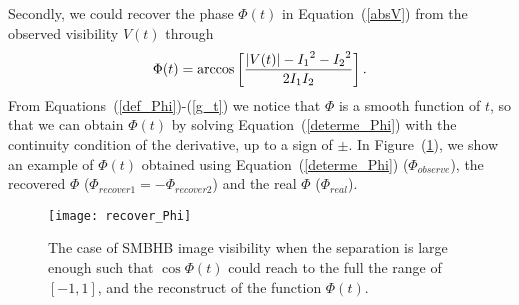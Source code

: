 \documentclass[twocolumn]{aastex62}
\def\[{\left[}
\def\]{\right]}
\def\m{\begin{eqnarray}}
\def\n{\end{eqnarray}}
\begin{document}
Secondly, we could recover the phase $\Phi(t)$ in Equation~(\ref{absV}) from the observed visibility $V(t)$ through
\m \label{determe_Phi}
{\Phi(t)}=\arccos{\left [ {|V(t)|-{I_1}^2-{I_2}^2 \over 2 I_1 I_2} \right ] }\,. 
\n
From Equations~(\ref{def_Phi})-(\ref{g_t}) we notice that $\Phi$ is a smooth function of $t$, so that we can obtain $\Phi(t)$ by solving Equation~(\ref{determe_Phi}) with the continuity condition of the derivative, up to a sign of $\pm$. In Figure~(\ref{recover_Phi}), we show an example of $\Phi(t)$ obtained using Equation~(\ref{determe_Phi}) ($\Phi_{observe}$), the recovered $\Phi$ ($\Phi_{recover1}=-\Phi_{recover2}$) and the real $\Phi$ ($\Phi_{real}$). 
%
\begin{figure}[h] %
\centering
\texttt{[image: recover\_Phi]} 
\caption{The case of SMBHB image visibility when the separation is large enough such that $\cos{\Phi(t)}$ could reach to the full the range of $\[-1, 1\]$, and the reconstruct of the function $\Phi(t)$. }
\label{recover_Phi}
\end{figure}
\end{document}
